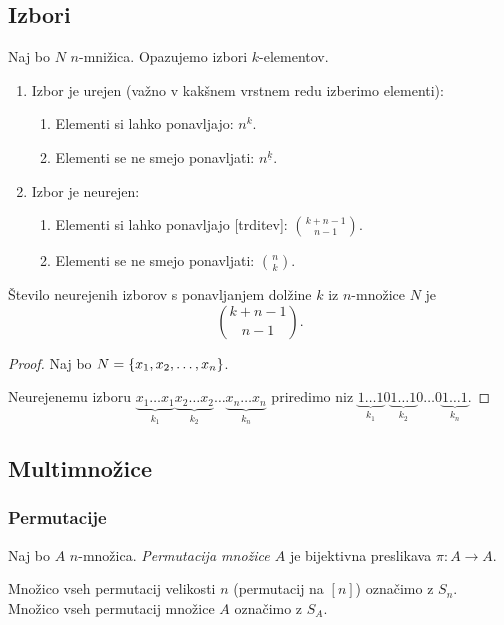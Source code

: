 \subsection{Izbori}
Naj bo $N$ $n$-mnižica. Opazujemo izbori $k$-elementov.
\begin{enumerate}
    \item Izbor je urejen (važno v kakšnem vrstnem redu izberimo elementi):
    \begin{enumerate}
        \item Elementi si lahko ponavljajo: $n^k$.
        \item Elementi se ne smejo ponavljati: $n^{\underline{k}}$.
    \end{enumerate}
    \item Izbor je neurejen:
    \begin{enumerate}
        \item Elementi si lahko ponavljajo [trditev]: $\binom{k + n- 1}{n-1}$.
        \item Elementi se ne smejo ponavljati: $\binom{n}{k}$.
    \end{enumerate}
\end{enumerate}

\begin{trditev}
    Število neurejenih izborov s ponavljanjem dolžine $k$ iz $n$-množice $N$ je 
    $$\binom{k+n-1}{n-1}.$$
\end{trditev}

\begin{proof}
    Naj bo $N = \left\{x_1, x_2, \ldots, x_n\right\}$. 
    
    Neurejenemu izboru $\underbrace{x_1\ldots x_1}_{k_1} \underbrace{x_2 \ldots x_2}_{k_2} \ldots \underbrace{x_n \ldots x_n}_{k_n}$ priredimo niz $\underbrace{1 \ldots 1}_{k_1} 0 \underbrace{1 \ldots 1}_{k_2} 0 \ldots 0 \underbrace{1 \ldots 1}_{k_n}$.
\end{proof}

\subsection{Multimnožice}
\subsubsection{Permutacije}
\begin{definicija}
    Naj bo $A$ $n$-množica. \emph{Permutacija množice $A$} je bijektivna preslikava $\pi: A \to A$.

    Množico vseh permutacij velikosti $n$ (permutacij na $[n]$) označimo z $S_n$. 
    Množico vseh permutacij množice $A$ označimo z $S_A$.
\end{definicija}

